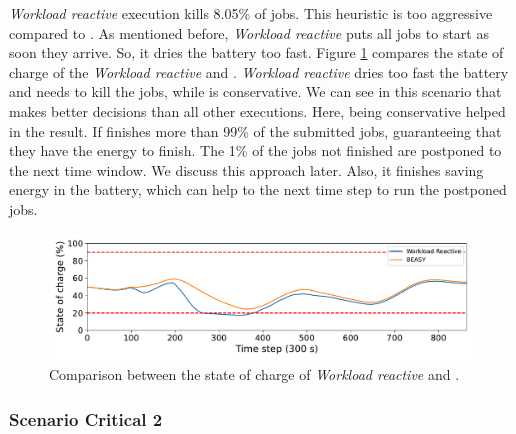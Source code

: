 \emph{Workload reactive} execution kills 8.05\% of jobs. This heuristic is too aggressive compared to \emph{\systemName}. As mentioned before, \emph{Workload reactive} puts all jobs to start as soon they arrive. So, it dries the battery too fast. Figure \ref{fig:critical_soc_s1} compares the state of charge of the \emph{Workload reactive} and \emph{\systemName}. \emph{Workload reactive} dries too fast the battery and needs to kill the jobs, while \emph{\systemName} is conservative. We can see in this scenario that \emph{\systemName} makes better decisions than all other executions. Here, being conservative helped in the result. If finishes more than 99\% of the submitted jobs, guaranteeing that they have the energy to finish. The 1\% of the jobs not finished are postponed to the next time window. We discuss this approach later. Also, it finishes saving energy in the battery, which can help to the next time step to run the postponed jobs.

\begin{figure}[!htb]
    \centering
    \includegraphics[scale=0.5]{Images/Heuristic/critical_soc_s1.pdf}
    \caption{Comparison between the state of charge of \emph{Workload reactive} and \emph{\systemName}.}
    \label{fig:critical_soc_s1}
\end{figure}

\clearpage

\subsubsection{Scenario Critical 2}

